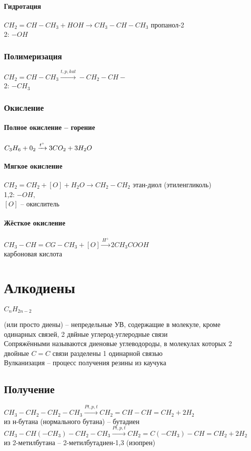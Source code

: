 \documentclass[a4paper]{article}
\begin{document}
		\paragraph{Гидротация}
		$CH_2=CH-CH_3+HOH \xrightarrow{} CH_3-CH-CH_3$ пропанол-2\\
		2: $-OH$
	\subsubsection{Полимеризация}
	$CH_2=CH-CH_3 \xrightarrow{t, p, kat} -CH_2-CH-$\\
	2: $-CH_3$
	\subsubsection{Окисление}
		\paragraph{Полное окисление -- горение}
		$C_{3}H_{6}+0_{2} \xrightarrow{t\degree} 3CO_{2}+3H_{2}O$
		\paragraph{Мягкое окисление}
		$CH_{2}=CH_{2}+[O]+H_{2}O \xrightarrow{} CH_{2}-CH_{2}$
		этан-диол (этиленгликоль)\\
		1,2: $-OH$,\\
		$[O]$ -- окислитель
		\paragraph{Жёсткое окисление}
		$CH_3-CH=CG-CH_3+[O] \xrightarrow{H^{+}} 2CH_{3}COOH$\\
		карбоновая кислота
\pagebreak

\section{Алкодиены} \begin{flushright} $C_{n}H_{2n-2}$ \end{flushright}
(или просто диены) -- непредельные УВ, содержащие в молекуле, кроме
одинарных связей, 2 двйные углерод-углеродные связи\\
Сопряжёнными называются диеновые углеводороды, в молекулах которых 2
двойные $C=C$ связи разделены 1 одинарной связью\\
Вулканизация -- процесс получения резины из каучука
\subsection{Получение}
		$CH_3-CH_2-CH_2-CH_3 \xrightarrow{Pt,p,t} CH_2=CH-CH=CH_2+2H_2$\\
		из н-бутана (нормального бутана) -- бутадиен\\
		$CH_{3}-CH(-CH_3)-CH_{2}-CH_{3} \xrightarrow{Pt,p,t}
		CH_{2}=C(-CH_{3})-CH=CH_{2}+2H_{2}$\\
		из 2-метилбутана -- 2-метилбутадиен-1,3 (изопрен)
\end{document}
